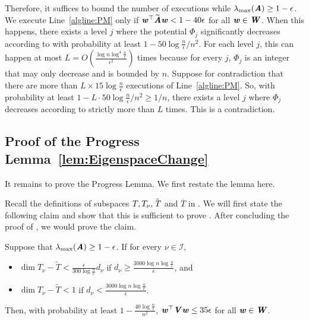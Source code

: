 Therefore, it suffices to bound the number of executions while $\lambda_{\max}(\AA)\ge1-\epsilon$. We execute Line~\ref{algline:PM} only if $\ww^{\top}\AAtil\ww<1-40\epsilon$ for all $\ww\in\WW$. When this happens, there exists a level $j$ where the potential $\Phi_{j}$ significantly decreases according to  with probability at least $1-50\log\frac{n}{\epsilon}/n^{2}$. For each level $j$, this can happen at most $L=O(\frac{\log n\log^{4}\frac{n}{\epsilon}}{\epsilon^{2}})$ times because for every $j$, $\Phi_{j}$ is an integer that may only decrease and is bounded by $n$. Suppose for contradiction that there are more than $L\times15\log\frac{n}{\epsilon}$ executions of Line~\ref{algline:PM}. So, with probability at least $1-L\cdot50\log\frac{n}{\epsilon}/n^{2}\ge1/n$, there exists a level $j$ where $\Phi_{j}$ decreases according to  strictly more than $L$ times. This is a contradiction. 











\subsection{Proof of the Progress Lemma~\ref{lem:EigenspaceChange}}\label{sec:progress}
It remains to prove the Progress Lemma. We first restate the lemma here.

\progress*
Recall the definitions of subspaces $T,T_\nu,\Ttil$ and $\overline{T}$ in .
We will first state the following claim and show that this is sufficient to prove . After concluding the proof of , we would prove the claim.

\begin{claim}\label{cl:progress} Suppose that $\lambda_{\max}(\AA) \geq 1-\epsilon$. If for every $\nu \in \mathcal{I}$, 
\begin{itemize}
\item $\dim{T_{\nu} -\tilde{T}} < \frac{\epsilon}{300\log\frac{n}{\epsilon}} d_{\nu}$ if $d_{\nu} \geq \frac{3000\log n\log\frac{n}{\epsilon}}{\epsilon}$, and 
\item $\dim{T_{\nu} -\tilde{T}} < 1$ if $d_{\nu} < \frac{3000\log n\log\frac{n}{\epsilon}}{\epsilon}$.
\end{itemize}
Then, with probability at least $1-\frac{40\log\frac{n}{\epsilon}}{n^2}$, $\ww^{\top}\VV\ww\leq 35 \epsilon$ for all $\ww\in \WW$.
\end{claim}
